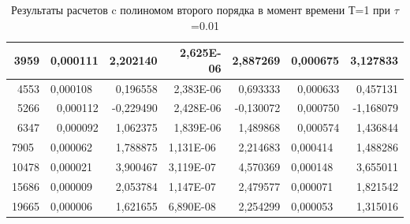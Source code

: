 \documentclass[14pt]{article}
\begin{document}
\begin{table}[h]
\begin{tabular}{|r|r|r|r|r|r|r|}
3959                        & 0,000111                      & 2,202140                  & 2,625E-06                      & 2,887269                  & 0,000675                      & 3,127833                    \\ \hline
4553                        & \multicolumn{1}{l|}{0,000108} & 0,196558                  & 2,383E-06                      & 0,693333                  & 0,000633                      & 0,457131                    \\ \hline
5266                        & 0,000112                      & -0,229490                 & 2,428E-06                      & -0,130072                 & 0,000750                      & -1,168079                   \\ \hline
6347                        & 0,000092                      & 1,062375                  & 1,839E-06                      & 1,489868                  & 0,000574                      & 1,436844                    \\ \hline
\multicolumn{1}{|l|}{7905}  & \multicolumn{1}{l|}{0,000062} & 1,788875                  & \multicolumn{1}{l|}{1,131E-06} & 2,214683                  & \multicolumn{1}{l|}{0,000414} & 1,488286                    \\ \hline
\multicolumn{1}{|l|}{10478} & \multicolumn{1}{l|}{0,000021} & 3,900467                  & \multicolumn{1}{l|}{3,119E-07} & 4,570369                  & \multicolumn{1}{l|}{0,000148} & 3,655011                    \\ \hline
\multicolumn{1}{|l|}{15686} & \multicolumn{1}{l|}{0,000009} & 2,053784                  & \multicolumn{1}{l|}{1,147E-07} & 2,479577                  & \multicolumn{1}{l|}{0,000071} & 1,821542                    \\ \hline
\multicolumn{1}{|l|}{19665} & \multicolumn{1}{l|}{0,000006} & 1,621655                  & \multicolumn{1}{l|}{6,890E-08} & 2,254299                  & \multicolumn{1}{l|}{0,000053} & 1,315016                    \\ \hline
\end{tabular}
\caption{Результаты расчетов c полиномом второго порядка в момент времени Т=1 при $\tau$=0.01}
\end{table}
\end{document}

